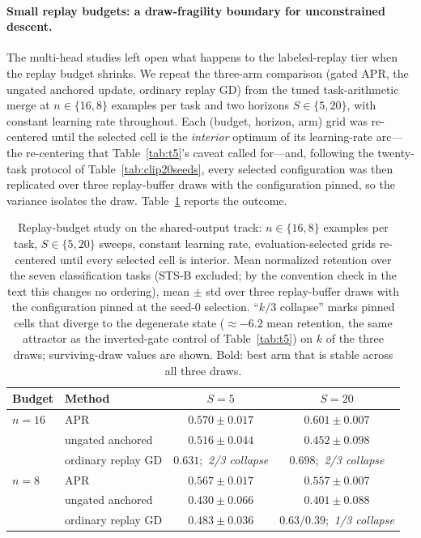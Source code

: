\documentclass[11pt]{article}
\begin{document}
\paragraph{Small replay budgets: a draw-fragility boundary for unconstrained descent.}
The multi-head studies left open what happens to the labeled-replay tier when the replay budget shrinks. We repeat the three-arm comparison (gated APR, the ungated anchored update, ordinary replay GD) from the tuned task-arithmetic merge at $n\in\{16,8\}$ examples per task and two horizons $S\in\{5,20\}$, with constant learning rate throughout. Each (budget, horizon, arm) grid was re-centered until the selected cell is the \emph{interior} optimum of its learning-rate arc---the re-centering that Table~\ref{tab:t5}'s caveat called for---and, following the twenty-task protocol of Table~\ref{tab:clip20seeds}, every selected configuration was then replicated over three replay-buffer draws with the configuration pinned, so the variance isolates the draw. Table~\ref{tab:t5budget} reports the outcome.

\begin{table}[t]
\centering
\small
\caption{Replay-budget study on the shared-output track: $n\in\{16,8\}$ examples per task, $S\in\{5,20\}$ sweeps, constant learning rate, evaluation-selected grids re-centered until every selected cell is interior. Mean normalized retention over the seven classification tasks (STS-B excluded; by the convention check in the text this changes no ordering), mean $\pm$ std over three replay-buffer draws with the configuration pinned at the seed-0 selection. ``$k/3$ collapse'' marks pinned cells that diverge to the degenerate state ($\approx-6.2$ mean retention, the same attractor as the inverted-gate control of Table~\ref{tab:t5}) on $k$ of the three draws; surviving-draw values are shown. Bold: best arm that is stable across all three draws.}
\label{tab:t5budget}
\begin{tabular}{llcc}
\toprule
Budget & Method & $S=5$ & $S=20$ \\
\midrule
$n=16$ & APR                 & $\mathbf{0.570\pm0.017}$ & $\mathbf{0.601\pm0.007}$ \\
       & ungated anchored    & $0.516\pm0.044$          & $0.452\pm0.098$ \\
       & ordinary replay GD  & $0.631$;\ \emph{2/3 collapse} & $0.698$;\ \emph{2/3 collapse} \\
\midrule
$n=8$  & APR                 & $\mathbf{0.567\pm0.017}$ & $\mathbf{0.557\pm0.007}$ \\
       & ungated anchored    & $0.430\pm0.066$          & $0.401\pm0.088$ \\
       & ordinary replay GD  & $0.483\pm0.036$          & $0.63/0.39$;\ \emph{1/3 collapse} \\
\bottomrule
\end{tabular}
\end{table}
\end{document}
